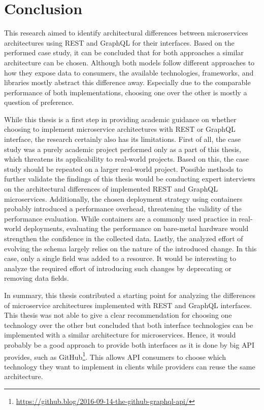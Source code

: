 \section{Conclusion}\label{sec:conclusion}

This research aimed to identify architectural differences between microservices architectures using \ac{REST} and GraphQL for their interfaces.
Based on the performed case study, it can be concluded that for both approaches a similar architecture can be chosen.
Although both models follow different approaches to how they expose data to consumers, the available technologies, frameworks, and libraries mostly abstract this difference away.
Especially due to the comparable performance of both implementations, choosing one over the other is mostly a question of preference.

While this thesis is a first step in providing academic guidance on whether choosing to implement microservice architectures with \ac{REST} or GraphQL interface, the research certainly also has its limitations.
First of all, the case study was a purely academic project performed only as a part of this thesis, which threatens its applicability to real-world projects.
Based on this, the case study should be repeated on a larger real-world project.
Possible methods to further validate the findings of this thesis would be conducting expert interviews on the architectural differences of implemented \ac{REST} and GraphQL microservices.
Additionally, the chosen deployment strategy using containers probably introduced a performance overhead, threatening the validity of the performance evaluation.
While containers are a commonly used practice in real-world deployments, evaluating the performance on bare-metal hardware would strengthen the confidence in the collected data.
Lastly, the analyzed effort of evolving the schema largely relies on the nature of the introduced change.
In this case, only a single field was added to a resource.
It would be interesting to analyze the required effort of introducing such changes by deprecating or removing data fields.

In summary, this thesis contributed a starting point for analyzing the differences of microservice architectures implemented with \ac{REST} and GraphQL interfaces.
This thesis was not able to give a clear recommendation for choosing one technology over the other but concluded that both interface technologies can be implemented with a similar architecture for microservices.
Hence, it would probably be a good approach to provide both interfaces as it is done by big \ac{API} provides, such as GitHub\footnote{\url{https://github.blog/2016-09-14-the-github-graphql-api/}}.
This allows \ac{API} consumers to choose which technology they want to implement in clients while providers can reuse the same architecture.


